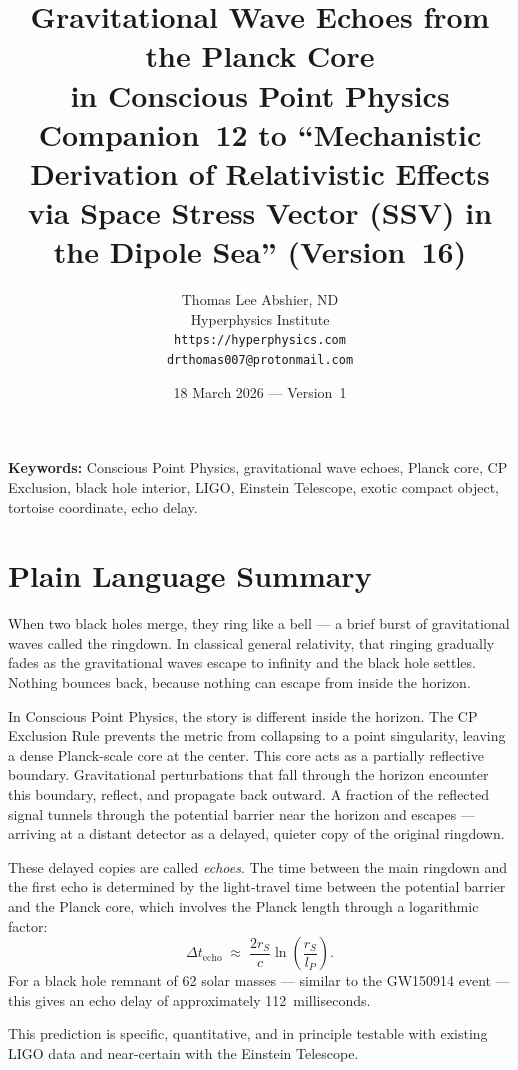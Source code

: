 \documentclass[12pt]{article}
\title{\textbf{Gravitational Wave Echoes from the Planck Core\\
in Conscious Point Physics}\\[6pt]
{\large Companion~12 to ``Mechanistic Derivation of Relativistic Effects\\
via Space Stress Vector (SSV) in the Dipole Sea'' (Version~16)}}
\author{Thomas Lee Abshier, ND\\
Hyperphysics Institute\\
\texttt{https://hyperphysics.com}\\
\texttt{drthomas007@protonmail.com}}
\date{18 March 2026 --- Version~1}
\newcommand{\lP}{l_P}
\newcommand{\rS}{r_S}
\newcommand{\Dt}{\Delta t_{\mathrm{echo}}}
\begin{document}
\maketitle

\noindent\textbf{Keywords:} Conscious Point Physics, gravitational wave echoes,
Planck core, CP Exclusion, black hole interior, LIGO, Einstein Telescope,
exotic compact object, tortoise coordinate, echo delay.

\section*{Plain Language Summary}

When two black holes merge, they ring like a bell — a brief burst of
gravitational waves called the ringdown.  In classical general relativity,
that ringing gradually fades as the gravitational waves escape to infinity
and the black hole settles.  Nothing bounces back, because nothing can
escape from inside the horizon.

In Conscious Point Physics, the story is different inside the horizon.
The CP Exclusion Rule prevents the metric from collapsing to a point
singularity, leaving a dense Planck-scale core at the center.  This core
acts as a partially reflective boundary.  Gravitational perturbations that
fall through the horizon encounter this boundary, reflect, and propagate
back outward.  A fraction of the reflected signal tunnels through the
potential barrier near the horizon and escapes — arriving at a distant
detector as a delayed, quieter copy of the original ringdown.

These delayed copies are called \emph{echoes}.  The time between the main
ringdown and the first echo is determined by the light-travel time between
the potential barrier and the Planck core, which involves the Planck length
through a logarithmic factor:
$$\Dt \;\approx\; \frac{2\rS}{c}\ln\!\left(\frac{\rS}{\lP}\right).$$
For a black hole remnant of 62 solar masses — similar to the GW150914 event
— this gives an echo delay of approximately 112~milliseconds.

This prediction is specific, quantitative, and in principle testable with
existing LIGO data and near-certain with the Einstein Telescope.
\end{document}
